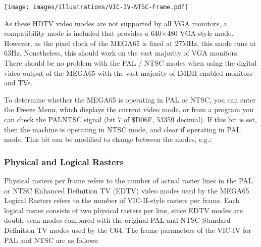 \texttt{[image: images/illustrations/VIC-IV-NTSC-Frame.pdf]}

As these HDTV video modes are not supported by all VGA monitors, a compatibility mode is included that provides a 640$\times$480 VGA-style mode. However, as the pixel clock of the MEGA65 is fixed at 27MHz, this mode runs at 63Hz.  Nonetheless, this should work on the vast majority of VGA monitors.  There should be no problem with the PAL / NTSC modes when using the digital video output of the MEGA65 with the vast majority of IMDH\texttrademark-enabled monitors and TVs.

To determine whether the MEGA65 is operating in PAL or NTSC, you can enter the Freeze Menu, which displays the current video mode, or from a program you can check the PALNTSC signal (bit 7 of \$D06F, 53359 decimal). If this bit is set, then the machine is operating in NTSC mode, and clear if operating in PAL mode. This bit can be modified to change between the modes, e.g.:


\subsubsection{Physical and Logical Rasters}

Physical rasters per frame refers to the number of actual raster lines in the PAL or
NTSC Enhanced Definition TV (EDTV) video modes used by the MEGA65.  Logical Rasters refers to the number of VIC-II-style rasters per frame.
Each logical raster consists of two physical rasters per line, since EDTV modes are double-scan modes compared with the original PAL and NTSC
Standard Definition TV modes used by the C64. The frame parameters of the VIC-IV for PAL and NTSC are as follows:

